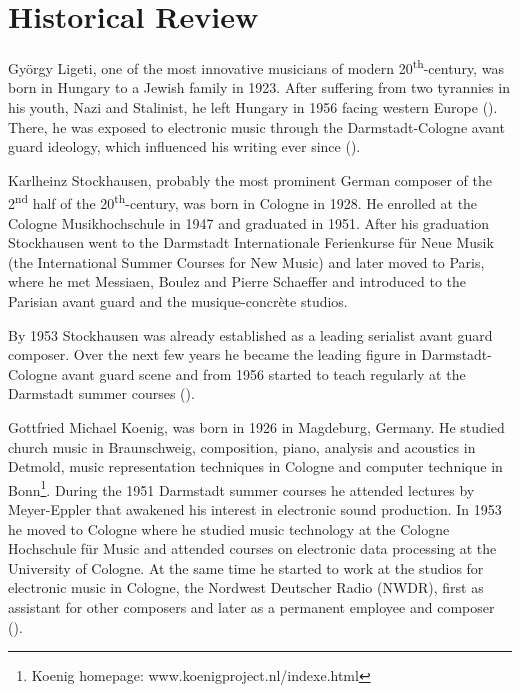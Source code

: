 \documentclass[a4paper,11pt]{article}
\begin{document}
\section{Historical Review}
\label{sec:historical_Review}

Gy{\"o}rgy Ligeti, one of the most innovative musicians of modern 20\textsuperscript{th}-century, was born in Hungary to a Jewish family in 1923.
After suffering from two tyrannies in his youth, Nazi and Stalinist, he left Hungary in 1956 facing western Europe (\cite{ligeti_grove}).
There, he was exposed to electronic music through the Darmstadt-Cologne avant guard ideology, which influenced his writing ever since (\cite[p. TODO]{levy2006}).

Karlheinz Stockhausen, probably the most prominent German composer of the 2\textsuperscript{nd} half of the 20\textsuperscript{th}-century, was born in Cologne in 1928.
He enrolled at the Cologne Musikhochschule in 1947 and graduated in 1951.
After his graduation Stockhausen went to the Darmstadt Internationale Ferienkurse f{\"u}r Neue Musik (the International Summer Courses for New Music) and later moved to Paris, where he met Messiaen, Boulez and Pierre Schaeffer and introduced to the Parisian avant guard and the musique-concr{\`e}te studios.

By 1953 Stockhausen was already established as a leading serialist avant guard composer.
Over the next few years he became the leading figure in Darmstadt-Cologne avant guard scene and from 1956 started to teach regularly at the Darmstadt summer courses (\cite{stockhausen_grove}).

Gottfried Michael Koenig, was born in 1926 in Magdeburg, Germany.
He studied church music in Braunschweig, composition, piano, analysis and acoustics in Detmold, music representation techniques in Cologne and computer technique in Bonn\footnote{Koenig homepage: www.koenigproject.nl/indexe.html}.
During the 1951 Darmstadt summer courses he attended lectures by Meyer-Eppler that awakened his interest in electronic sound production.
In 1953 he moved to Cologne where he studied music technology at the Cologne Hochschule f{\"u}r Music and attended courses on electronic data processing at the University of Cologne.
At the same time he started to work at the studios for electronic music in Cologne, the Nordwest Deutscher Radio (NWDR), first as assistant for other composers and later as a permanent employee and composer (\cite{koenig_grove}).
\end{document}
